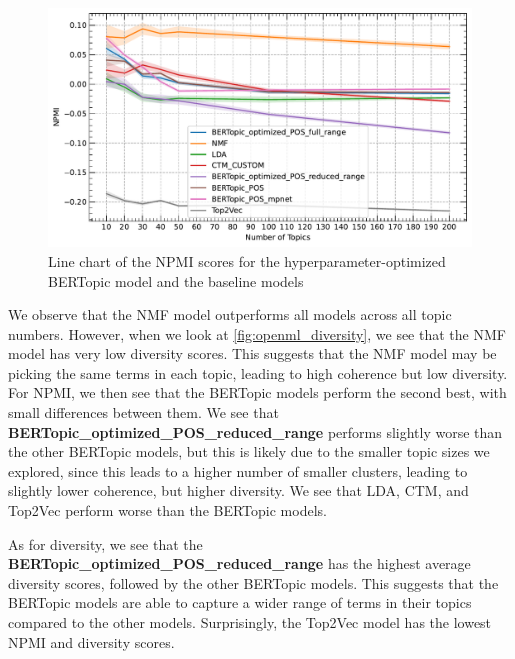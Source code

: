 \begin{figure}[h]
    \centering
    \includegraphics[width=1\textwidth]{figures/openml_npmi.pdf}
    \caption{Line chart of the NPMI scores for the hyperparameter-optimized BERTopic model and the baseline models}
    \label{fig:openml_npmi}
\end{figure}

We observe that the NMF model outperforms all models across all topic numbers. However, when we look at \cref{fig:openml_diversity}, we see that the NMF model has very low diversity scores. This suggests that the NMF model may be picking the same terms in each topic, leading to high coherence but low diversity. For NPMI, we then see that the BERTopic models perform the second best, with small differences between them. We see that \textbf{BERTopic\_optimized\_POS\_reduced\_range} performs slightly worse than the other BERTopic models, but this is likely due to the smaller topic sizes we explored, since this leads to a higher number of smaller clusters, leading to slightly lower coherence, but higher diversity. We see that LDA, CTM, and Top2Vec perform worse than the BERTopic models.

As for diversity, we see that the \textbf{BERTopic\_optimized\_POS\_reduced\_range} has the highest average diversity scores, followed by the other BERTopic models. This suggests that the BERTopic models are able to capture a wider range of terms in their topics compared to the other models. Surprisingly, the Top2Vec model has the lowest NPMI and diversity scores.

